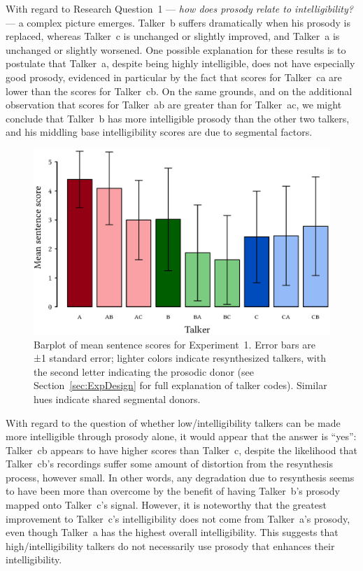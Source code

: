 With regard to Research Question~1 — \emph{how does prosody relate to intelligibility?} — a complex picture emerges.  Talker~\ac{b} suffers dramatically when his prosody is replaced, whereas Talker~\ac{c} is unchanged or slightly improved, and Talker~\ac{a} is unchanged or slightly worsened.  One possible explanation for these results is to postulate that Talker~\ac{a}, despite being highly intelligible, does not have especially good prosody, evidenced in particular by the fact that scores for Talker~\ac{ca} are lower than the scores for Talker~\ac{cb}.  On the same grounds, and on the additional observation that scores for Talker~\ac{ab} are greater than for Talker~\ac{ac}, we might conclude that Talker~\ac{b} has more intelligible prosody than the other two talkers, and his middling base intelligibility scores are due to segmental factors.

\begin{figure}[bt]
	\begin{centering}
	\includegraphics{figures/results/ExpOneBarplot.eps}
	\caption[Barplot of mean sentence scores for Experiment~1]{Barplot of mean sentence scores for Experiment~1.  Error bars are ±1 standard error; lighter colors indicate resynthesized talkers, with the second letter indicating the prosodic donor (see Section~\ref{sec:ExpDesign} for full explanation of talker codes).  Similar hues indicate shared segmental donors.\label{fig:ExpOneBarplot}}
	\end{centering}
\end{figure}

With regard to the question of whether low\-/intelligibility talkers can be made more intelligible through prosody alone, it would appear that the answer is “yes”: Talker~\ac{cb} appears to have higher scores than Talker~\ac{c}, despite the likelihood that Talker~\ac{cb}’s recordings suffer some amount of distortion from the resynthesis process, however small.  In other words, any degradation due to resynthesis seems to have been more than overcome by the benefit of having Talker~\ac{b}’s prosody mapped onto Talker~\ac{c}’s signal.  However, it is noteworthy that the greatest improvement to Talker~\ac{c}’s intelligibility does not come from Talker~\ac{a}’s prosody, even though Talker~\ac{a} has the highest overall intelligibility.  This suggests that high\-/intelligibility talkers do not necessarily use prosody that enhances their intelligibility.

